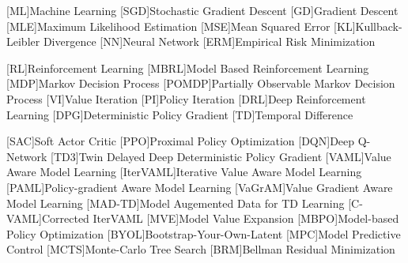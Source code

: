 [ML]{Machine Learning}
[SGD]{Stochastic Gradient Descent}
[GD]{Gradient Descent}
[MLE]{Maximum Likelihood Estimation}
[MSE]{Mean Squared Error}
[KL]{Kullback-Leibler Divergence}
[NN]{Neural Network}
[ERM]{Empirical Risk Minimization}

[RL]{Reinforcement Learning}
[MBRL]{Model Based Reinforcement Learning}
[MDP]{Markov Decision Process}
[POMDP]{Partially Observable Markov Decision Process}
[VI]{Value Iteration}
[PI]{Policy Iteration}
[DRL]{Deep Reinforcement Learning}
[DPG]{Deterministic Policy Gradient}
[TD]{Temporal Difference}

[SAC]{Soft Actor Critic}
[PPO]{Proximal Policy Optimization}
[DQN]{Deep Q-Network}
[TD3]{Twin Delayed Deep Deterministic Policy Gradient}
[VAML]{Value Aware Model Learning}
[IterVAML]{Iterative Value Aware Model Learning}
[PAML]{Policy-gradient Aware Model Learning}
[VaGrAM]{Value Gradient Aware Model Learning}
[MAD-TD]{Model Augemented Data for TD Learning}
[C-VAML]{Corrected IterVAML}
[MVE]{Model Value Expansion}
[MBPO]{Model-based Policy Optimization}
[BYOL]{Bootstrap-Your-Own-Latent}
[MPC]{Model Predictive Control}
[MCTS]{Monte-Carlo Tree Search}
[BRM]{Bellman Residual Minimization}

